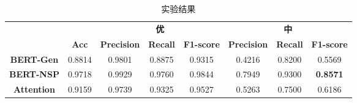 \documentclass[11pt]{article}
\begin{document}
\begin{CJK}{UTF8}{gkai}
\begin{table}[htbp]
  \centering
  \begin{tabular}{cccccccc}
    \hline
    \multicolumn{2}{c}{\textcolor[rgb]{ 1,  1,  1}{}} & \multicolumn{3}{c}{\textbf{优}} & \multicolumn{3}{c}{\textbf{中}} \\
    & {\textbf{Acc}} & {\textbf{Precision}} & {\textbf{Recall}} & {\textbf{F1-score}} & {\textbf{Precision}} & {\textbf{Recall}} & {\textbf{F1-score}} \\
    \hline
    {\textbf{BERT-Gen}} & 0.8814  & 0.9801  & 0.8875  & 0.9315  & 0.4216  & 0.8200  & 0.5569  \\
    \hline
    {\textbf{BERT-NSP}} & 0.9718  & 0.9929  & 0.9760  & 0.9844  & 0.7949  & 0.9300  & \textbf{0.8571 } \\
    \hline
    \textbf{Attention} & 0.9159  & 0.9739  & 0.9325  & 0.9527  & 0.5263  & 0.7500  & 0.6186  \\
    \hline
  \end{tabular}%
  \caption{实验结果}
  \label{tab:addlabel}%
\end{table}%


%
%
%

\end{CJK}
\end{document}

